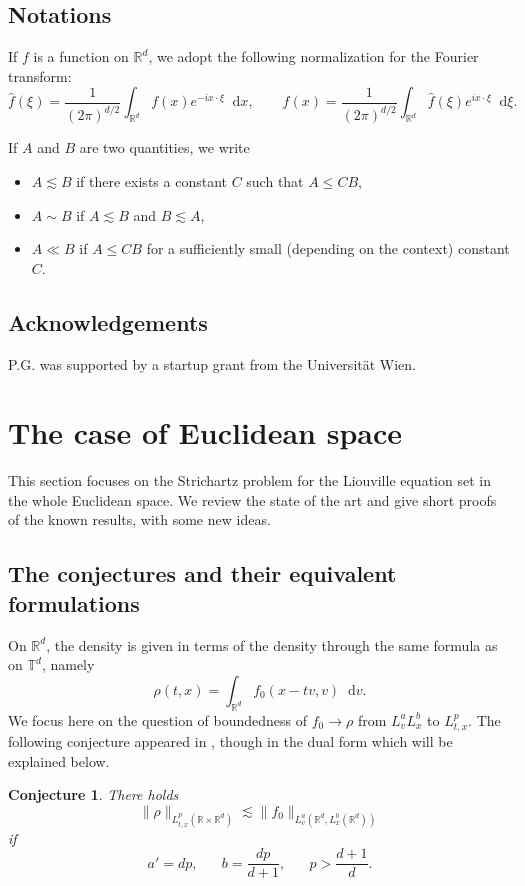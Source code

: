 \documentclass[11pt,a4paper,reqno]{amsart}
\theoremstyle{plain}
\newtheorem{conj}{Conjecture}
\theoremstyle{remark}
\newcommand{\dd}{\mathop{}\!\mathrm{d}}
\begin{document}
\subsection{Notations} If $f$ is a function on $\mathbb{R}^d$, we adopt the following normalization for the Fourier transform:
\[
    \widehat{f}(\xi) = \frac{1}{(2\pi)^{d/2}} \int_{\mathbb{R}^d} f(x) e^{-i x \cdot \xi} \dd x, \qquad f(x) = \frac{1}{(2\pi)^{d/2}} \int_{\mathbb{R}^d} \widehat{f}(\xi) e^{i x \cdot \xi} \dd \xi.
\]

If $A$ and $B$ are two quantities, we write
\begin{itemize}
    \item $A \lesssim B$ if there exists a constant $C$ such that $A \leq CB$,
    \item $A \sim B$ if $A \lesssim B$ and $B \lesssim A$,
    \item $A \ll B$ if $A \leq CB$ for a sufficiently small (depending on the context) constant $C$.
\end{itemize}

\subsection*{Acknowledgements} P.G. was supported by a startup grant from the Universit\"at Wien.

\section{The case of Euclidean space}
\label{section_Euclidean_space}

This section focuses on the Strichartz problem for the Liouville equation set in the whole Euclidean space. We review the state of the art and give short proofs of the known results, with some new ideas.

\subsection{The conjectures and their equivalent formulations} On $\mathbb{R}^d$, the density is given in terms of the density through the same formula as on $\mathbb{T}^d$, namely
\[
    \rho(t,x) = \int_{\mathbb{R}^d} f_0(x-tv,v) \dd v.
\]
We focus here on the question of boundedness of $f_0 \to \rho$ from $L^a_v L^b_x$ to $L^p_{t,x}$. The following conjecture appeared in \cite{Christ}, though in the dual form which will be explained below.

\begin{conj}
\label{conjecture1}
There holds
\[
    \| \rho \|_{L^p_{t,x}(\mathbb{R} \times \mathbb{R}^d)} \lesssim \| f_0 \|_{L^a_v (\mathbb{R}^d, L^b_x(\mathbb{R}^d))}
\]
if 
\[
    a'=dp, \;\;\;\;\;\; b = \frac {dp}{d+1}, \;\;\;\;\;\; p > \frac{d+1}{d}.
\]
\end{conj} 
\end{document}
